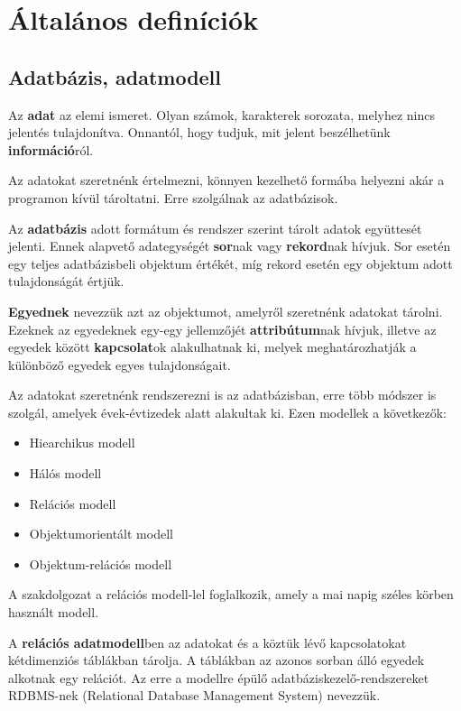 \chapter{Általános definíciók}
\section{Adatbázis, adatmodell}

\begin{defi}[Adat]
Az \textbf{adat} az elemi ismeret. Olyan számok, karakterek sorozata, melyhez nincs jelentés tulajdonítva. Onnantól, hogy tudjuk, mit jelent beszélhetünk \textbf{információ}ról. 
\end{defi}

Az adatokat szeretnénk értelmezni, könnyen kezelhető formába helyezni akár a programon kívül tároltatni. Erre szolgálnak az adatbázisok.

\begin{defi}
Az \textbf{adatbázis} adott formátum és rendszer szerint tárolt adatok együttesét jelenti. Ennek alapvető adategységét \textbf{sor}nak vagy \textbf{rekord}nak hívjuk. Sor esetén egy teljes adatbázisbeli objektum értékét, míg rekord esetén egy objektum adott tulajdonságát értjük.
\end{defi}

\begin{defi}
\textbf{Egyednek} nevezzük azt az objektumot, amelyről szeretnénk adatokat tárolni. Ezeknek az egyedeknek egy-egy jellemzőjét \textbf{attribútum}nak hívjuk, illetve az egyedek között \textbf{kapcsolat}ok alakulhatnak ki, melyek meghatározhatják a különböző egyedek egyes tulajdonságait.
\end{defi}

Az adatokat szeretnénk rendszerezni is az adatbázisban, erre több módszer is szolgál, amelyek évek-évtizedek alatt alakultak ki. Ezen modellek a következők:
\begin{itemize}
    \item Hiearchikus modell
    \item Hálós modell
    \item Relációs modell
    \item Objektumorientált modell
    \item Objektum-relációs modell
\end{itemize}
A szakdolgozat a relációs modell-lel foglalkozik, amely a mai napig széles körben használt modell.

\begin{defi}
A \textbf{relációs adatmodell}ben az adatokat és a köztük lévő kapcsolatokat kétdimenziós táblákban tárolja. A táblákban az azonos sorban álló egyedek alkotnak egy relációt. Az erre a modellre épülő adatbáziskezelő-rendszereket RDBMS-nek (Relational Database Management System) nevezzük.
\end{defi}

